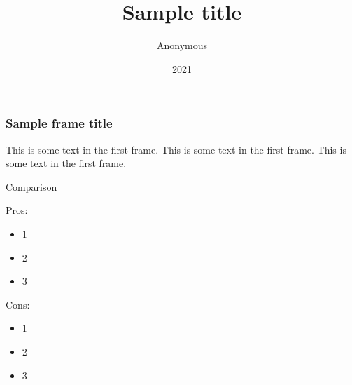 \documentclass{beamer}
\title{Sample title}
\author{Anonymous}
\institute{Overleaf}
\date{2021}
\begin{document}
\frame{\titlepage}

\begin{frame}
\frametitle{Sample frame title}
This is some text in the first frame. This is some text in the first frame. This is some text in the first frame.
\end{frame}


\begin{frame}{Comparison}
\pause
    \begin{minipage}[t]{0.48\linewidth}
        Pros:
        \begin{itemize}
            \item<3-> 1
            \item<4-> 2
            \item<5-> 3
        \end{itemize}
    \end{minipage}
    \hfill
    \begin{minipage}[t]{0.48\linewidth}%
        Cons:
        \begin{itemize}
            \item<3-> 1
            \item<4-> 2
            \item<5-> 3
        \end{itemize}
    \end{minipage}
\end{frame}
\end{document}

